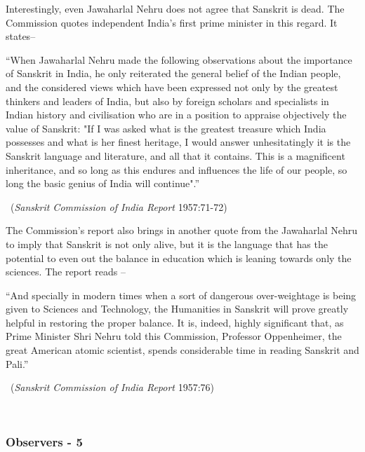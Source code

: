 Interestingly, even Jawaharlal Nehru does not agree that Sanskrit is dead. The Commission quotes independent India’s first prime minister in this regard. It states–
\begin{myquote}
\eleven
“When Jawaharlal Nehru made the following observations about the importance of Sanskrit in India, he only reiterated the general belief of the Indian people, and the considered views which have been expressed not only by the greatest thinkers and leaders of India, but also by foreign scholars and specialists in Indian history and civilisation who are in a position to appraise objectively the value of Sanskrit: "If I was asked what is the greatest treasure which India possesses and what is her finest heritage, I would answer unhesitatingly it is the Sanskrit language and literature, and all that it contains. This is a magnificent inheritance, and so long as this endures and influences the life of our people, so long the basic genius of India will continue".” 
\vskip -5pt

~\hfill({\sl Sanskrit Commission of India Report} 1957:71-72)
\end{myquote}

The Commission’s report also brings in another quote from the Jawaharlal Nehru to imply that Sanskrit is not only alive, but it is the language that has the potential to even out the balance in education which is leaning towards only the sciences. The report reads  – 
\begin{myquote}
\eleven
“And specially in modern times when a sort of dangerous over-weightage is being given to Sciences and Technology, the Humanities in Sanskrit will prove greatly helpful in restoring the proper balance. It is, indeed, highly significant that, as Prime Minister Shri Nehru told this Commission, Professor Oppenheimer, the great American atomic scientist, spends considerable time in reading Sanskrit and Pali.” 
\vskip -5pt

~\hfill({\sl Sanskrit Commission of India Report} 1957:76)
\end{myquote}

~\\[-45pt]

\subsubsection{Observers - 5}
\vskip -3pt

